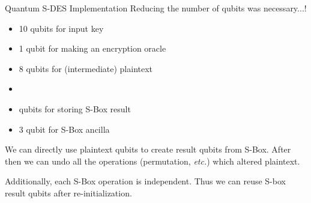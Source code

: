 \documentclass{beamer}
\begin{document}
   	\begin{frame}{Quantum S-DES Implementation}
        Reducing the number of qubits was necessary...!
        \begin{itemize}
            \item 10 qubits for input key
            \item 1 qubit for making an encryption oracle
            \item 8 qubits for (intermediate) plaintext
            \item {} 
            \item {} qubits for storing S-Box result
            \item 3 qubit for S-Box ancilla
        \end{itemize}
   		 We can directly use plaintext qubits to create result qubits from S-Box. After then we can undo all the operations (permutation, \textit{etc.}) which altered plaintext.
           
        Additionally, each S-Box operation is independent. Thus we can reuse S-box result qubits after re-initialization.
   	\end{frame} 
       
\end{document}
